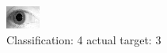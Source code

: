 \begin{figure}[h!]
\begin{center}
\includegraphics[width=0.60\columnwidth]{figures/ID1809_class_4_target_3.png}
\end{center}
\caption{ Classification: 4 actual target: 3}
\label{fig:ID1809_class_4_target_3}
\end{figure}
